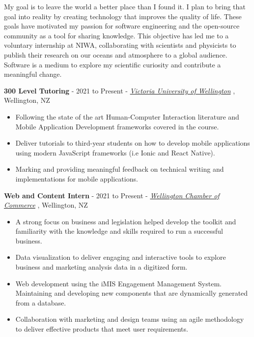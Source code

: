 \documentclass[9pt]{developercv}
\begin{document}
My goal is to leave the world a better place than I found it. I plan to bring that goal into reality by creating technology that improves the quality of life. These goals have motivated my passion for software engineering and the open-source community as a tool for sharing knowledge. This objective has led me to a voluntary internship at NIWA, collaborating with scientists and physicists to publish their research on our oceans and atmosphere to a global audience. Software is a medium to explore my scientific curiosity and contribute a meaningful change.



\textbf{300 Level Tutoring} - 2021 to Present - \emph{\href{https://www.wgtn.ac.nz/}{Victoria University of Wellington}} , Wellington, NZ
\begin{itemize}
    \item Following the state of the art Human-Computer Interaction literature and Mobile Application Development frameworks covered in the course.
    \item Deliver tutorials to third-year students on how to develop mobile applications using modern JavaScript frameworks (i.e Ionic and React Native). 
    \item Marking and providing meaningful feedback on technical writing and implementations for mobile applications.
\end{itemize}

\textbf{Web and Content Intern} - 2021 to Present - \emph{\href{https://www.wecc.org.nz/}{Wellington Chamber of Commerce}} , Wellington, NZ
\begin{itemize}
    \item A strong focus on business and legislation helped develop the toolkit and familiarity with the knowledge and skills required to run a successful business.
    \item Data visualization to deliver engaging and interactive tools to explore business and marketing analysis data in a digitized form. 
    \item Web development using the iMIS Engagement Management System. Maintaining and developing new components that are dynamically generated from a database. 
    \item Collaboration with marketing and design teams using an agile methodology to deliver effective products that meet user requirements.
\end{itemize}
\end{document}
